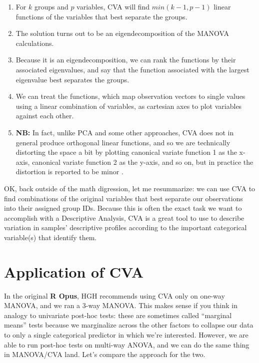 \documentclass[
]{book}
\providecommand{\tightlist}{%
  \setlength{\itemsep}{0pt}\setlength{\parskip}{0pt}}
\begin{document}
\begin{enumerate}
\def\labelenumi{\arabic{enumi}.}
\tightlist
\item
  For \(k\) groups and \(p\) variables, CVA will find \(min(k-1, p-1)\) linear functions of the variables that best separate the groups.\\
\item
  The solution turns out to be an eigendecomposition of the MANOVA calculations.
\item
  Because it is an eigendecomposition, we can rank the functions by their associated eigenvalues, and say that the function associated with the largest eigenvalue best separates the groups.
\item
  We can treat the functions, which map observation vectors to single values using a linear combination of variables, as cartesian axes to plot variables against each other.
\item
  \textbf{NB:} In fact, unlike PCA and some other approaches, CVA does not in general produce orthogonal linear functions, and so we are technically distorting the space a bit by plotting canonical variate function 1 as the x-axis, canonical variate function 2 as the y-axis, and so on, but in practice the distortion is reported to be minor \citep[@heymannSensory2017]{rencherMethods2002}.
\end{enumerate}

OK, back outside of the math digression, let me resummarize: we can use CVA to find combinations of the original variables that best separate our observations into their assigned group IDs. Because this is often the exact task we want to accomplish with a Descriptive Analysis, CVA is a great tool to use to describe variation in samples' descriptive profiles according to the important categorical variable(s) that identify them.

\section{Application of CVA}\label{application-of-cva}

In the original \textbf{R Opus}, HGH recommends using CVA only on one-way MANOVA, and we ran a 3-way MANOVA. This makes sense if you think in analogy to univariate post-hoc tests: these are sometimes called ``marginal means'' tests because we marginalize across the other factors to collapse our data to only a single categorical predictor in which we're interested. However, we are able to run post-hoc tests on multi-way ANOVA, and we can do the same thing in MANOVA/CVA land. Let's compare the approach for the two.
\end{document}
